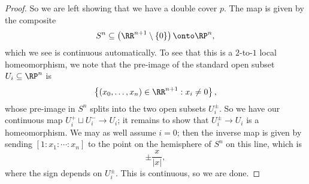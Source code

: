 \documentclass[../notes.tex]{subfiles}
\begin{document}
\begin{proof}
	So we are left showing that we have a double cover $p$. The map is given by the composite
	\[S^n\subseteq\left(\RR^{n+1}\setminus\{0\}\right)\onto\RP^n,\]
	which we see is continuous automatically. To see that this is a $2$-to-$1$ local homeomorphism, we note that the pre-image of the standard open subset $U_i\subseteq\RP^n$ is
	\[\left\{(x_0,\ldots,x_n)\in\RR^{n+1}:x_i\ne0\right\},\]
	whose pre-image in $S^n$ splits into the two open subsets $U_i^\pm$. So we have our continuous map $U_i^+\sqcup U_i^-\to U_i$; it remains to show that $U_i^\pm\to U_i$ is a homeomorphism. We may as well assume $i=0$; then the inverse map is given by sending $[1:x_1:\cdots:x_n]$ to the point on the hemisphere of $S^n$ on this line, which is
	\[\pm\frac x{\left|x\right|},\]
	where the sign depends on $U_i^\pm$. This is continuous, so we are done.
\end{proof}
\end{document}
